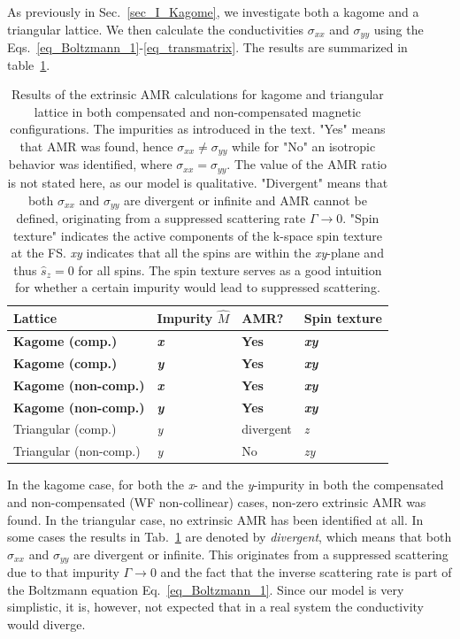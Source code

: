 \documentclass[prb,showpacs,amsmath,amssymb,superscriptaddress,twocolumn,floatfix]{revtex4-1}
\begin{document}
As previously in Sec.~\ref{sec_I_Kagome}, we investigate both a kagome and a triangular lattice. We then calculate the conductivities $\sigma_{xx}$ and $\sigma_{yy}$ using the Eqs.~\ref{eq_Boltzmann_1}-\ref{eq_transmatrix}. The results are summarized in table~\ref{T_extrinsic}.\\

\begin{table}
	\begin{tabular}{llll}
		Lattice & Impurity $\hat{M}$ & AMR? & Spin texture \\
		\hline 
		\textbf{Kagome (comp.)} & \textbf{\textit{x}} & \textbf{Yes} & \textbf{\textit{xy}} \\
		\textbf{Kagome (comp.)} & \textbf{\textit{y}} & \textbf{Yes} & \textbf{\textit{xy}} \\
		\textbf{Kagome (non-comp.)} & \textbf{\textit{x}} & \textbf{Yes} & \textbf{\textit{xy}} \\
		\textbf{Kagome (non-comp.)} & \textbf{\textit{y}} & \textbf{Yes} & \textbf{\textit{xy}} \\
		\hline 
		Triangular (comp.) & \textit{y} & divergent & \textit{z} \\
		Triangular (non-comp.) & \textit{y} & No & \textit{zy} \\
	\end{tabular}
	\caption{Results of the extrinsic AMR calculations for kagome and triangular lattice in both compensated and non-compensated magnetic configurations. The impurities as introduced in the text. "Yes" means that AMR was found, hence $\sigma_{xx} \neq \sigma_{yy}$ while for "No" an isotropic behavior was identified, where $\sigma_{xx} = \sigma_{yy}$. The value of the AMR ratio is not stated here, as our model is qualitative. "Divergent" means that both $\sigma_{xx}$ and $\sigma_{yy}$ are divergent or infinite and AMR cannot be defined, originating from a suppressed scattering rate $\Gamma \rightarrow 0$. "Spin texture" indicates the active components of the k-space spin texture at the FS. \textit{xy} indicates that all the spins are within the \textit{xy}-plane and thus $\hat{s}_z = 0$ for all spins. The spin texture serves as a good intuition for whether a certain impurity would lead to suppressed scattering.}
	\label{T_extrinsic}
\end{table}


In the kagome case, for both the \textit{x}- and the \textit{y}-impurity in both the compensated and non-compensated (WF non-collinear) cases, non-zero extrinsic AMR was found. In the triangular case, no extrinsic AMR has been identified at all. In some cases the results in Tab.~\ref{T_extrinsic} are denoted by \textit{divergent}, which means that both $\sigma_{xx}$ and $\sigma_{yy}$ are divergent or infinite. This originates from a suppressed scattering due to that impurity $\Gamma \rightarrow 0$ and the fact that the inverse scattering rate is part of the Boltzmann equation Eq.~\ref{eq_Boltzmann_1}. Since our model is very simplistic, it is, however, not expected that in a real system the conductivity would diverge.
\end{document}
